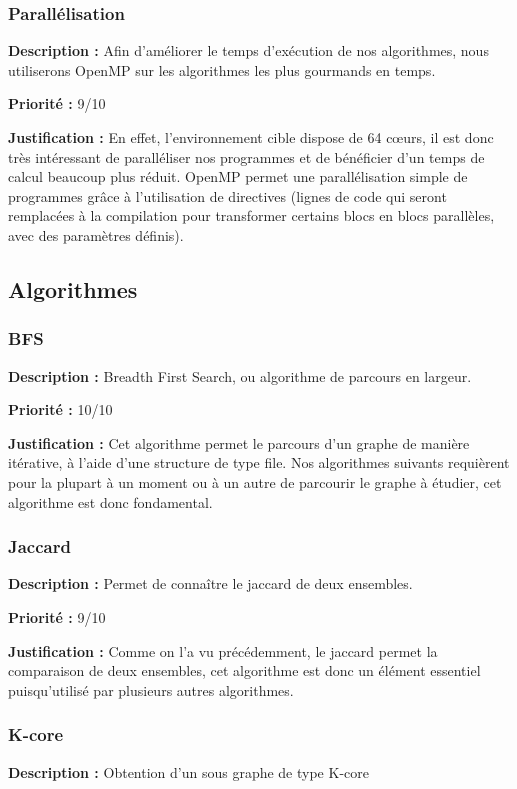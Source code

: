 \begin{titlepage}
\subsubsection{Parallélisation}
{
\textbf{Description :} Afin d'améliorer le temps d'exécution de nos algorithmes, nous utiliserons OpenMP \cite{OpenMP}  sur les algorithmes les plus gourmands en temps.

\textbf{Priorité :} 9/10

\textbf{Justification :} En effet, l'environnement cible dispose de 64 cœurs, il est donc très intéressant de paralléliser nos programmes et de bénéficier d'un temps de calcul beaucoup plus réduit. OpenMP \cite{OpenMP} permet une parallélisation simple de programmes grâce à l'utilisation de directives (lignes de code qui seront remplacées à la compilation pour transformer certains blocs en blocs parallèles, avec des paramètres définis).
}

\subsection{Algorithmes}

\subsubsection{BFS}
{
\textbf{Description :} Breadth First Search, ou algorithme de parcours en largeur. \cite{BFS}

\textbf{Priorité :} 10/10

\textbf{Justification :} Cet algorithme permet le parcours d'un graphe de manière itérative, à l'aide d'une structure de type file. Nos algorithmes suivants requièrent pour la plupart à un moment ou à un autre de parcourir le graphe à étudier, cet algorithme est donc fondamental.
}

\subsubsection{Jaccard}
{
\textbf{Description :} Permet de connaître le jaccard \cite{jaccard} de deux ensembles.

\textbf{Priorité :} 9/10

\textbf{Justification :} Comme on l'a vu précédemment, le jaccard permet la comparaison de deux ensembles, cet algorithme est donc un élément essentiel puisqu'utilisé par plusieurs autres algorithmes.
}

\subsubsection{K-core}
{
\textbf{Description :} Obtention d'un sous graphe de type K-core

}
\end{titlepage}
